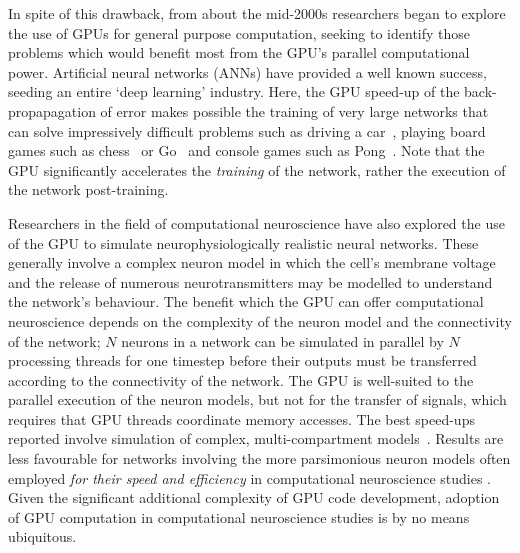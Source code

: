 \documentclass[11pt, a4paper]{article}
\begin{document}
In spite of this drawback, from about the mid-2000s researchers began to
explore the use of GPUs for general purpose computation, seeking to identify
those problems which would benefit most from the GPU's parallel computational
power.  Artificial neural networks (ANNs) have provided a well known success,
seeding an entire `deep learning' industry. Here, the GPU speed-up of the
back-propapagation of error makes possible the training of very large networks
that can solve impressively difficult problems such as driving a
car~\cite{bojarski_end_2016,bojarski_explaining_2017}, playing board games
such as chess~\cite{thrun_learning_1995,david_deepchess_2016} or Go~\cite{silver_general_2018} and console games such as
Pong~\cite{mnih_playing_2013}. Note that the GPU significantly accelerates
the \emph{training} of the network, rather the execution of the network
post-training.

Researchers in the field of computational neuroscience have also explored the
use of the GPU to simulate neurophysiologically realistic neural networks.
These generally involve a complex neuron model in which the cell's membrane
voltage and the release of numerous neurotransmitters may be modelled to
understand the network's behaviour. The benefit which the GPU can offer
computational neuroscience depends on the complexity of the neuron model and
the connectivity of the network; $N$ neurons in a network can be simulated in
parallel by $N$ processing threads for one timestep before their outputs must
be transferred according to the connectivity of the network. The GPU is
well-suited to the parallel execution of the neuron models, but not for the
transfer of signals, which requires that GPU threads coordinate memory
accesses. The best speed-ups reported involve simulation of complex,
multi-compartment models~\cite{stimberg_brian2genn_2020}. Results are less
favourable for networks involving the more parsimonious neuron models often
employed \emph{for their speed and efficiency} in computational neuroscience
studies \cite{nageswaran_configurable_2009}. Given the significant additional
complexity of GPU code development, adoption of GPU computation in
computational neuroscience studies is by no means ubiquitous.
\end{document}
